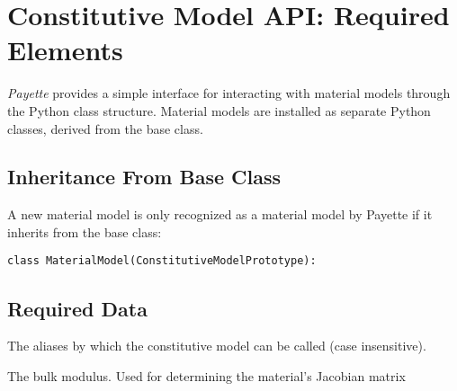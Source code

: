 \documentclass[letterpaper,10pt,english]{sphinxmanual}
\begin{document}
\section{Constitutive Model API: Required Elements}
\label{Files/installing_materials:constitutive-model-api-required-elements}
\emph{Payette} provides a simple interface for interacting with material models
through the Python class structure. Material models are installed as separate
Python classes, derived from the  base class.


\subsection{Inheritance From Base Class}
\label{Files/installing_materials:inheritance-from-base-class}
A new material model  is only recognized as a material model by
Payette if it inherits from the  base class:

\begin{Verbatim}[commandchars=\\\{\}]
class MaterialModel(ConstitutiveModelPrototype):
\end{Verbatim}


\subsection{Required Data}
\label{Files/installing_materials:required-data}

\begin{fulllineitems}
\label{Files/installing_materials:MaterialModel.aliases}
The aliases by which the constitutive model can be called (case insensitive).

\end{fulllineitems}


\begin{fulllineitems}
\label{Files/installing_materials:MaterialModel.bulk_modulus}
The bulk modulus.  Used for determining the material's Jacobian matrix

\end{fulllineitems}

\end{document}
